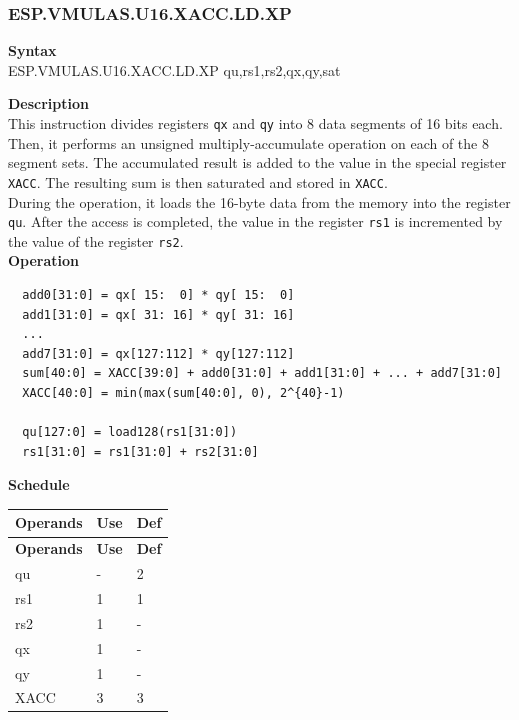 \newpage
\subsubsection{ESP.VMULAS.U16.XACC.LD.XP}\label{instruction:ESPVMULASU16XACCLDXP}
\textbf{Syntax}\\
ESP.VMULAS.U16.XACC.LD.XP qu,rs1,rs2,qx,qy,sat

\textbf{Description}\\
This instruction divides registers \lstinline{qx} and \lstinline{qy} into 8 data segments of 16 bits each. Then, it performs an unsigned multiply-accumulate operation on each of the 8 segment sets. The accumulated result is added to the value in the special register \lstinline{XACC}. The resulting sum is then saturated and stored in \lstinline{XACC}. \\ During the operation, it loads the 16-byte data from the memory into the register \lstinline{qu}. After the access is completed, the value in the register \lstinline{rs1} is incremented by the value of the register \lstinline{rs2}.\\

\textbf{Operation}
\begin{lstlisting}
  add0[31:0] = qx[ 15:  0] * qy[ 15:  0]
  add1[31:0] = qx[ 31: 16] * qy[ 31: 16]
  ...
  add7[31:0] = qx[127:112] * qy[127:112]
  sum[40:0] = XACC[39:0] + add0[31:0] + add1[31:0] + ... + add7[31:0]
  XACC[40:0] = min(max(sum[40:0], 0), 2^{40}-1)

  qu[127:0] = load128(rs1[31:0])
  rs1[31:0] = rs1[31:0] + rs2[31:0]
\end{lstlisting}

\textbf{Schedule}\\
\begin{longtable}[c]{|l|l|l|}
    \hline
    \rowcolor{lightgray}
    \textbf{Operands} & \textbf{Use} & \textbf{Def} \\\hline
    \endfirsthead
    \hline
    \rowcolor{lightgray}
     \textbf{Operands} & \textbf{Use} & \textbf{Def} \\\hline
    \endhead
    \hline
    \endfoot

    qu & - & 2 \\\hline
    rs1 & 1 & 1 \\\hline
    rs2 & 1 & - \\\hline
     qx & 1 & - \\\hline
     qy & 1 & - \\\hline
     XACC & 3 & 3

\end{longtable}

